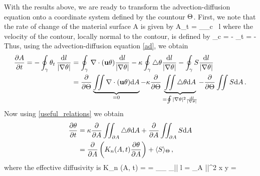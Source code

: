 \documentclass[11pt]{article}
\begin{document}
With the results above, we are ready to transform the advection-diffusion equation onto a coordinate system defined by the countour $\Theta$. First, we note that the rate of change of the  material surface A is given by
\beq
A_t =  \oint_\gamma \vu_c \cdot \hat{\vn} \, \dd l\com
\eeq
where the velocity of the contour, locally normal to the contour, is defined by
\beq
\vu_c = - \theta_t  = -  \hat{\vn}\per
\eeq
Thus, using the advection-diffusion equation \eqref{ad}, we obtain
\begin{align}
\frac{\partial A}{\partial t} =  - \oint_\gamma \theta_t \, \frac{{\rm d} l}{{|\nabla \theta|}} &= 
                       \oint_\gamma \, \nabla \cdot (\mathbf{u} \theta) \frac{{\rm d} l}{{|\nabla \theta|}} 
                      - \kappa \oint_\gamma \triangle \theta   \frac{{\rm d} l}{{|\nabla \theta|}} 
                      - \oint_\gamma S  \frac{{\rm d} l}{{|\nabla \theta|}}\nonumber \\
                     & =  \frac{\partial}{\partial \Theta}\underbrace{\iint \nabla \cdot (\mathbf{u} \theta) {\rm d} A}_{=0}
                        -  \kappa  \frac{\partial}{\partial \Theta}\underbrace{\iint \triangle \theta {\rm d} A}_{=\oint |\nabla\theta|^2\frac{{\rm d} l}{|\nabla \theta|}}
                        -  \frac{\partial}{\partial \Theta}\iint S  {\rm d} A  \, .
\end{align}
Now using \eqref{useful_relations} we obtain
\begin{align}
\frac{\partial \theta}{\partial t} &= \kappa \frac{\partial}{\partial A} \iint_{\partial A} \triangle \theta {\rm d} A + \frac{\partial }{\partial A} \iint_{\partial A} S  {\rm d} A \nonumber\\
                     &= \frac{\partial}{\partial A}\left(K_n(A,t) \frac{\partial \theta}{\partial A}\right) + \langle S \rangle_\Theta\, ,
\end{align}
where the effective diffusivity  is
\beq
\label{KeDefn}
K_n (A, t) =   
        =  \kappa  {}_{\oint_\gamma {}} \oint_\gamma |\nabla\vth| \dd l 
        =  \iint_{\p A}  \kappa  |\nabla\vth|^2 \dd x \dd y = 
         \per
\eeq
\end{document}
